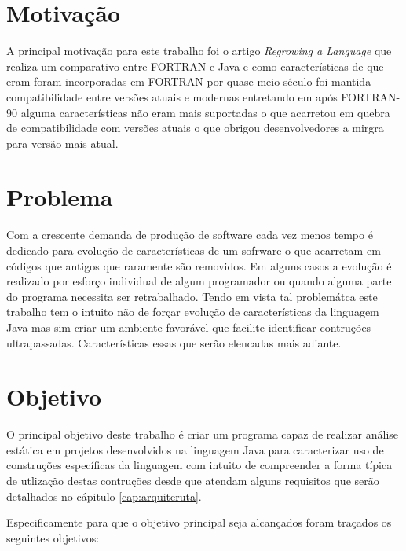 \section{Motivação}
A principal motivação para este trabalho foi o artigo \textit{Regrowing a Language} \cite{Overbey:2009} que realiza um comparativo entre FORTRAN e Java  e como características de que eram foram incorporadas em FORTRAN por quase meio século foi mantida compatibilidade entre versões atuais e modernas entretando em após FORTRAN-90 alguma características não eram mais suportadas o que acarretou em quebra de compatibilidade com versões atuais o que obrigou desenvolvedores a mirgra para versão mais atual.
	
\section{Problema}
Com a crescente demanda de produção de software cada vez menos tempo é dedicado para evolução de características de um sofrware o que acarretam em códigos que antigos que raramente são removidos. Em alguns casos a evolução é realizado por esforço individual de algum programador ou quando alguma parte do programa necessita ser retrabalhado. Tendo em vista tal problemátca este trabalho tem o intuito não de forçar evolução de características da linguagem Java mas sim criar um ambiente favorável que facilite identificar contruções ultrapassadas. Características essas que serão elencadas mais adiante.

\section{Objetivo}
O principal objetivo deste trabalho é criar um programa capaz de realizar análise estática em projetos desenvolvidos na linguagem Java para caracterizar uso de construções específicas da linguagem com intuito de compreender a forma típica de utlização destas contruções desde que atendam alguns requisitos que serão detalhados no cápitulo \ref{cap:arquiteruta}.
	
Especificamente para que o objetivo principal seja alcançados foram traçados os seguintes objetivos:

